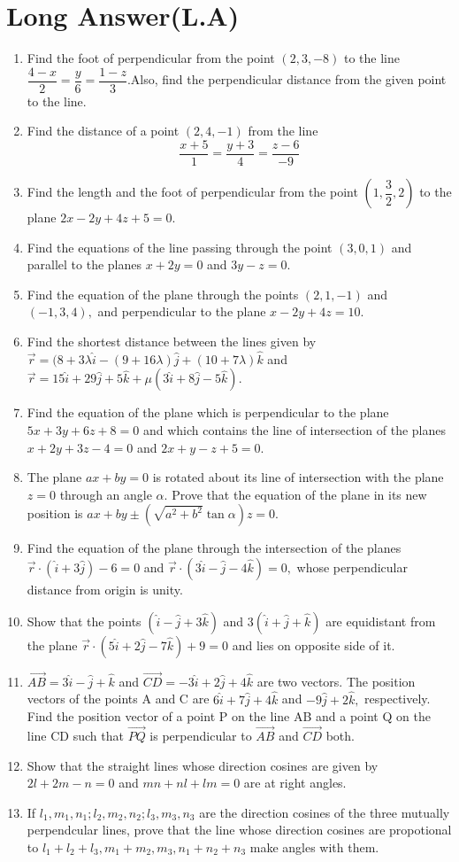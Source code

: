 \documentclass[12pt]{article}
\providecommand{\brak}[1]{\ensuremath{\left(#1\right)}}
\begin{document}
\section*{Long Answer(L.A)}
\begin{enumerate}[resume]
\item Find the foot of perpendicular from the point $(2,3,-8)$ to the line  $\dfrac{4-x}{2}=\dfrac{y}{6}=\dfrac{1-z}{3}$.Also, find the perpendicular distance from the given point to the line.
\item Find the distance of a point $(2,4,-1)$ from the line $$\frac{x+5}{1}=\frac{y+3}{4}=\frac{z-6}{-9}$$
\item Find the length and the foot of perpendicular from the point $ \brak{1,\dfrac{3}{2} ,2 }$ to the plane $2x-2y+4z+5=0.$
\item Find the equations of the line passing through the point $(3,0,1)$ and parallel to the planes $x+2y=0$ and $3y-z=0.$
\item Find the equation of the plane through the points $(2,1,-1)$ and $(-1,3,4),$ and 
perpendicular to the plane $x-2y+4z=10.$
\item Find the shortest distance between the lines given by $\overrightarrow{r}=(8+3\lambda\hat{i}-(9+16\lambda)\hat{j}+(10+7\lambda)\hat{k}$ and $\overrightarrow{r}=15\hat{i}+29\hat{j}+5\hat{k}+\mu(3\hat{i}+8\hat{j}-5\hat{k}).$
\item Find the equation of the plane which is perpendicular to the plane $5x+3y+6z+8=0$ and which contains the line of intersection of the planes $x+2y+3z-4=0$ and $2x+y-z+5=0.$
\item The plane $ax+by=0$ is rotated about its line of intersection with the plane $z=0$ through an angle $\alpha.$ Prove that the equation of the plane in its new position is $ax+by \pm (\sqrt{a^2+b^2} \tan\alpha)z=0.$
\item Find the equation of the plane through the intersection of the planes $\overrightarrow{r} \cdot (\hat{i}+3\hat{j}) - 6=0$ and $\overrightarrow{r} \cdot (3\hat{i}-\hat{j}-4\hat{k})=0,$ whose perpendicular distance from origin is unity.
\item Show that the points $(\hat{i}-\hat{j}+3\hat{k})$ and $3(\hat{i}+\hat{j}+\hat{k})$ are equidistant from the plane $\overrightarrow{r} \cdot (5\hat{i}+2\hat{j}-7\hat{k})+9=0$ and lies on opposite side of it.
\item $\overrightarrow{AB}=3\hat{i}-\hat{j}+\hat{k}$ and $\overrightarrow{CD}=-3\hat{i}+2\hat{j}+4\hat{k}$ are two vectors. The position vectors of the points A and C are $6\hat{i}+7\hat{j}+4\hat{k}$ and $-9\hat{j}+2\hat{k},$ respectively. Find the position vector of a point P on the line AB and a point Q on the line CD such that $\overrightarrow{PQ}$ is perpendicular to $\overrightarrow{AB}$ and $\overrightarrow{CD}$ both.
\item Show that the straight lines whose direction cosines are given by $2l+2m-n=0$ and $mn+nl+lm=0$ are at right angles.
\item If $l_1, m_1, n_1;l_2, m_2, n_2;l_3, m_3, n_3$ are the direction cosines of the three mutually perpendcular lines, prove that the line whose direction cosines are propotional to $l_1+l_2+l_3 , m_1+m_2,m_3, n_1+n_2+n_3$ make angles with them.
\end{enumerate}
\end{document}

